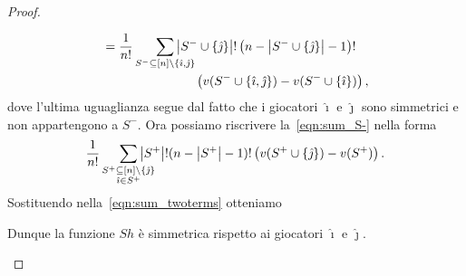 \documentclass[a4paper,11pt]{article}
\theoremstyle{definition}				%
\theoremstyle{remark}
\theoremstyle{plain}
\begin{document}
\begin{proof}
\begin{itemize}
\begin{align}
\begin{multlined}[b]
                    = \frac{1}{n!}\smashoperator[r]{\sum_{S^-\subseteq[n]\setminus\{\hat{\imath},\hat{\jmath}\}}}\qty|S^-\cup\{\hat{\jmath}\}|!\left(n-\qty|S^-\cup\{\hat{\jmath}\}|-1\right)!\\
                    \left(v(S^-\cup\{\hat{\imath},\hat{\jmath}\})-v(S^-\cup\{\hat{\imath}\})\right),
                \end{multlined}
            \end{align}
            dove l'ultima uguaglianza segue dal fatto che i giocatori $\hat{\imath}$ e $\hat{\jmath}$ sono simmetrici e non appartengono a $S^-$. Ora possiamo riscrivere la~\eqref{eqn:sum_S-} nella forma
            \[
                \frac{1}{n!} \smashoperator[r]{\sum_{\crampedsubstack{S^+\subseteq[n]\setminus\{\hat{\jmath}\}\\\hat{\imath}\in S^+}}}\qty|S^+|!(n-\qty|S^+|-1)!\left( v(S^+\cup\qty{\hat{\jmath}})-v(S^+) \right).
            \]
            Sostituendo nella~\eqref{eqn:sum_twoterms} otteniamo
            Dunque la funzione $\mathit{Sh}$ è simmetrica rispetto ai giocatori $\hat{\imath}$ e $\hat{\jmath}$.\qedhere
		\end{itemize}
	\end{proof}


\end{document}
